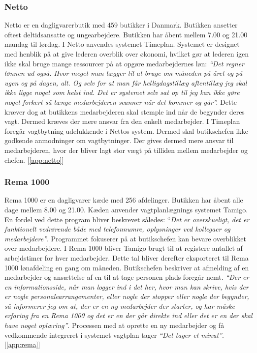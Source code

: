 \subsubsection{Netto}
Netto er en dagligvarerbutik med 459 butikker i Danmark. Butikken ansetter oftest deltidsansatte og ungearbejdere. Butikken har åbent mellem 7.00 og 21.00 mandag til lørdag. I Netto anvendes systemet Timeplan. Systemet er designet med henblik på at give lederen overblik over økonomi, hvilket gør at lederen igen ikke skal bruge mange ressourcer på at opgøre medarbejdernes løn:\textit{ “Det regner lønnen ud også. Hvor meget man lægger til at bruge om måneden på året og på ugen og på dagen, alt. Og selv for at man får helligdagstillæg aftentillæg jeg skal ikke ligge noget som helst ind. Det er systemet selv sat op til jeg kan ikke gøre noget forkert så længe medarbejderen scanner når det kommer og går”.} Dette kræver dog at butikkens medarbejderen skal stemple ind når de begynder deres vagt. Dermed kræves der mere ansvar fra den enkelt medarbejder. I Timeplan foregår vagtbytning udelukkende i Nettos system. Dermed skal butikschefen ikke godkende anmodninger om vagtbytninger. Der gives dermed mere ansvar til medarbejderen, hvor der bliver lagt stor vægt på tilliden mellem medarbejder og chefen. [\ref{app:netto}]

\subsubsection{Rema 1000}
Rema 1000 er en dagligvarer kæde med 256 afdelinger. Butikken har åbent alle dage mellem 8.00 og 21.00. Kæden anvender vagtplanlægnings systemet  Tamigo. En fordel ved dette program bliver beskrevet således: “\textit{Det er overskueligt, det er funktionelt vedrørende både med telefonnumre, oplysninger ved kollegaer og medarbejdere”}. Programmet fokuserer på at butikschefen kan bevare overblikket over medarbejdere. I Rema 1000 bliver Tamigo brugt til at registere antallet af arbejdstimer for hver medarbejder. Dette tal bliver derefter eksporteret til Rema 1000 lønafdeling en gang om måneden. Butikschefen beskriver at afmelding af en medarbejder og ansættelse af en til at tage personen plads foregår nemt.
\textit{“Der er en informationsside, når man logger ind i det her, hvor man kan skrive, hvis der er nogle personalearrangementer, eller nogle der stopper eller nogle der begynder, så informerer jeg om at, der er en ny medarbejder der starter, og har måske erfaring fra en Rema 1000 og det er en der går direkte ind eller det er en der skal have noget oplæring”}. Processen med at oprette en ny medarbejder og få vedkommende integreret i systemet vagtplan tager \textit{“Det tager et minut”}. [\ref{app:rema}]

